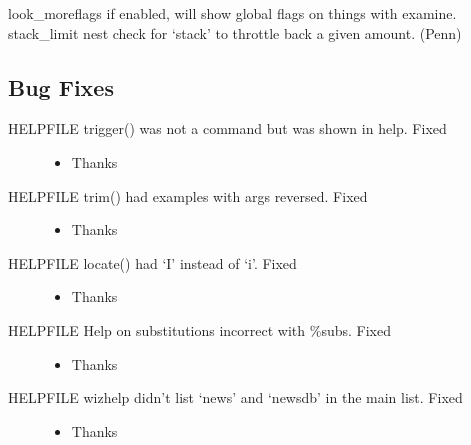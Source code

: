 \documentclass[letterpaper,10pt,english]{sphinxmanual}
\begin{document}
\sphinxAtStartPar
look\_moreflags \sphinxhyphen{} if enabled, will show global flags on things with examine.
stack\_limit \sphinxhyphen{} nest check for ‘stack’ to throttle back a given amount. (Penn)


\subsection{Bug Fixes}
\label{\detokenize{changelog:id25}}\begin{description}
\item[{HELPFILE \sphinxhyphen{} trigger() was not a command but was shown in help. \sphinxhyphen{}Fixed}] \leavevmode\begin{itemize}
\item {} 
\sphinxAtStartPar
Thanks 

\end{itemize}

\item[{HELPFILE \sphinxhyphen{} trim() had examples with args reversed.  \sphinxhyphen{} Fixed}] \leavevmode\begin{itemize}
\item {} 
\sphinxAtStartPar
Thanks 

\end{itemize}

\item[{HELPFILE \sphinxhyphen{} locate() had ‘I’ instead of ‘i’.  \sphinxhyphen{} Fixed}] \leavevmode\begin{itemize}
\item {} 
\sphinxAtStartPar
Thanks 

\end{itemize}

\item[{HELPFILE \sphinxhyphen{} Help on substitutions incorrect with \%\sphinxhyphen{}subs.  \sphinxhyphen{} Fixed}] \leavevmode\begin{itemize}
\item {} 
\sphinxAtStartPar
Thanks 

\end{itemize}

\item[{HELPFILE \sphinxhyphen{} wizhelp didn’t list ‘news’ and ‘newsdb’ in the main list. \sphinxhyphen{} Fixed}] \leavevmode\begin{itemize}
\item {} 
\sphinxAtStartPar
Thanks 


\end{itemize}
\end{description}
\end{document}
